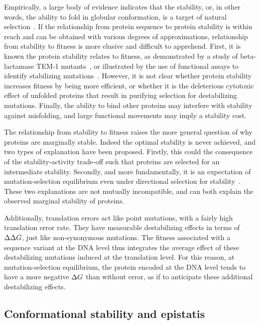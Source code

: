 Empirically, a large body of evidence indicates that the stability, or, in other words, the ability to fold in globular conformation, is a target of natural selection~\citep{Sikosek2014}.
If the relationship from protein sequence to protein stability is within reach and can be obtained with various degrees of approximations, relationship from stability to fitness is more elusive and difficult to apprehend.
First, it is known the protein stability relates to fitness, as demonstrated by a study of beta-lactamase TEM-1 mutants~\citep{Jacquier2013}, or illustrated by the use of functional assays to identify stabilizing mutations~\citep{Araya2012}.
However, it is not clear whether protein stability increases fitness by being more efficient, or whether it is the deleterious cytotoxic effect of unfolded proteins that result in purifying selection for destabilizing mutations.
Finally, the ability to bind other proteins may interfere with stability against misfolding, and large functional movements may imply a stability cost.

The relationship from stability to fitness raises the more general question of why proteins are marginally stable.
Indeed the optimal stability is never achieved, and two types of explanation have been proposed.
Firstly, this could the consequence of the stability-activity trade-off such that proteins are selected for an intermediate stability.
Secondly, and more fundamentally, it is an expectation of mutation-selection equilibrium even under directional selection for stability~\citep{Taverna2002}.
These two explanations are not mutually incompatible, and can both explain the observed marginal stability of proteins.

Additionally, translation errors act like point mutations, with a fairly high translation error rate.
They have measurable destabilizing effects in terms of $\Delta \Delta G$, just like non-synonymous mutations.
The fitness associated with a sequence variant at the \acrshort{DNA} level thus integrates the average effect of these destabilizing mutations induced at the translation level.
For this reason, at mutation-selection equilibrium, the protein encoded at the \acrshort{DNA} level tends to have a more negative $\Delta G$ than without error, as if to anticipate these additional destabilizing effects.

\subsection{Conformational stability and epistatis}
\label{subsec:conformational-stability-and-epistatis}

